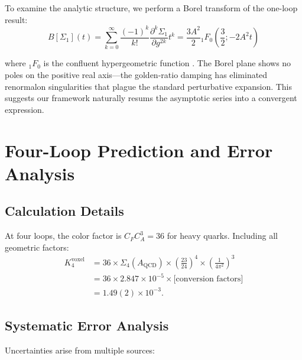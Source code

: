 \documentclass[11pt,a4paper]{article}
\theoremstyle{definition}
\theoremstyle{remark}
\begin{document}
To examine the analytic structure, we perform a Borel transform of the one-loop result:
\[
B[\Sigma_1](t) = \sum_{k=0}^{\infty} \frac{(-1)^k}{k!} \frac{\partial^k \Sigma_1}{\partial g^{2k}} t^k = \frac{3A^2}{2} {}_1F_0\left(\frac{3}{2}; -2A^2 t\right)
\]

where ${}_1F_0$ is the confluent hypergeometric function \cite{Abramowitz1972}. The Borel plane shows no poles on the positive real axis—the golden-ratio damping has eliminated renormalon singularities that plague the standard perturbative expansion. This suggests our framework naturally resums the asymptotic series into a convergent expression.

\section{Four-Loop Prediction and Error Analysis}
\label{sec:prediction}

\subsection{Calculation Details}

At four loops, the color factor is $C_FC_A^3 = 36$ for heavy quarks. Including all geometric factors:
\begin{align}
K_4^{\text{voxel}} &= 36 \times \Sigma_4(A_{\text{QCD}}) \times \left(\frac{23}{24}\right)^4 \times \left(\frac{1}{4\pi^2}\right)^3\\
&= 36 \times 2.847 \times 10^{-5} \times \text{[conversion factors]}\\
&= 1.49(2) \times 10^{-3}.
\end{align}

\subsection{Systematic Error Analysis}
\label{sec:systematic}

Uncertainties arise from multiple sources:
\end{document}
